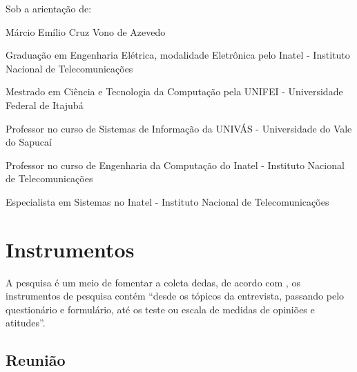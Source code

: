 \par Sob a arientação de:
\par Márcio Emílio Cruz Vono de Azevedo
\par Graduação em Engenharia Elétrica, modalidade Eletrônica pelo Inatel -
Instituto Nacional de Telecomunicações
\par Mestrado em Ciência e Tecnologia da Computação pela UNIFEI - Universidade
Federal de Itajubá
\par Professor no curso de Sistemas de Informação da UNIVÁS - Universidade do
Vale do Sapucaí
\par Professor no curso de Engenharia da Computação do Inatel - Instituto
Nacional de Telecomunicações
\par Especialista em Sistemas no Inatel - Instituto Nacional de Telecomunicações







\section{Instrumentos}

\par A pesquisa é um meio de fomentar a coleta dedas, de acordo com
, os instrumentos de pesquisa contém “desde os
tópicos da entrevista, passando pelo questionário e formulário, 
até os teste ou escala de medidas de opiniões e atitudes”.

\subsection{Reunião}

